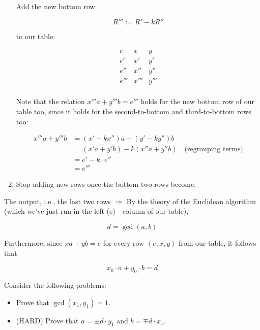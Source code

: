\documentclass[11pt, draft]{article}
\begin{document}
\begin{enumerate}
          Add the new bottom row

          \[
              R''' := R' - k R''
          \]

          to our table:

          \[
              \begin{array}{c|c|c}
                  e    & x    & y    \\
                  \hline
                  e'   & x'   & y'   \\
                  e''  & x''  & y''  \\
                  e''' & x''' & y''' \\
              \end{array}
          \]

          Note that the relation \(x'''a + y'''b = e'''\) holds for the new bottom row of
          our table too, since it holds for the second-to-bottom and third-to-bottom rows
          too:

          \[
              \begin{aligned}
                  x'''a + y'''b & = (x' - kx'')a + (y' - ky'')b                                  \\
                                & = (x'a + y'b) - k(x''a + y''b) \quad \text{(regrouping terms)} \\
                                & = e' - k \cdot e''                                             \\
                                & = e'''
              \end{aligned}
          \]

    \item Stop adding new rows once the bottom two rows become.
\end{enumerate}

The output, i.e., the last two rows \(\Rightarrow\) By the theory of the
Euclidean algorithm (which we've just run in the left (e) - column of our
table),

\[
    d = \operatorname{gcd}(a, b)
\]

Furthermore, since \(xa + yb = e\) for every row \((e, x, y)\) from our table,
it follows that

\[
    x_0 \cdot a + y_0 \cdot b = d
\]

\begin{problem}
Consider the following problems:
\begin{itemize}
    \item Prove that \(\operatorname{gcd}(x_1, y_1) = 1\).
    \item (HARD) Prove that \(a = \pm d \cdot y_1\) and \(b = \mp d \cdot x_1\).
\end{itemize}
\end{problem}
\end{document}
